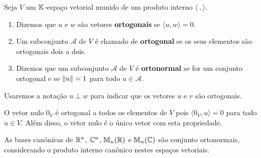 \begin{definicao}
	Seja $V$ um $\mathbb{K}$-espa\c{c}o vetorial munido de um produto interno $\langle\ , \rangle$.
	\begin{enumerate}
		\item Dizemos que $u$ e $w$ s\~ao vetores \textbf{ortogonais} se $\langle u, w \rangle = 0$.
		\item Um subconjunto $\mathcal{A}$ de $V$ \'e chamado de \textbf{ortogonal} se os seus elementos s\~ao ortogonais dois a dois.
		\item Dizemos que um subconjunto $\mathcal{A}$ de $V$ \'e \textbf{ortonormal} se for um conjunto ortogonal e se $\left\lVert u\right\rVert = 1$ para todo $u \in \mathcal{A}$.
	\end{enumerate}
\end{definicao}

\begin{notacao}
	Usaremos a nota\c{c}\~ao $u \perp w$ para indicar que os vetores $u$ e $v$ s\~ao ortogonais.
\end{notacao}

\begin{observacao}
	O vetor nulo $0_V$ \'e ortogonal a todos os elementos de $V$ pois $\langle 0_V, u \rangle = 0$ para todo $u \in V$. Al\'em disso, o vetor nulo \'e o \'unico vetor com esta propriedade.
\end{observacao}

\begin{exemplo}
	As bases can\^onicas de $\mathbb{R}^n$, $\mathbb{C}^n$, $\mathbb{M}_n(\mathbb{R})$ e $\mathbb{M}_n(\mathbb{C})$ s\~ao conjunto ortonormais, considerando o produto interno can\^onico nestes espa\c{c}os vetoriais.
\end{exemplo}

